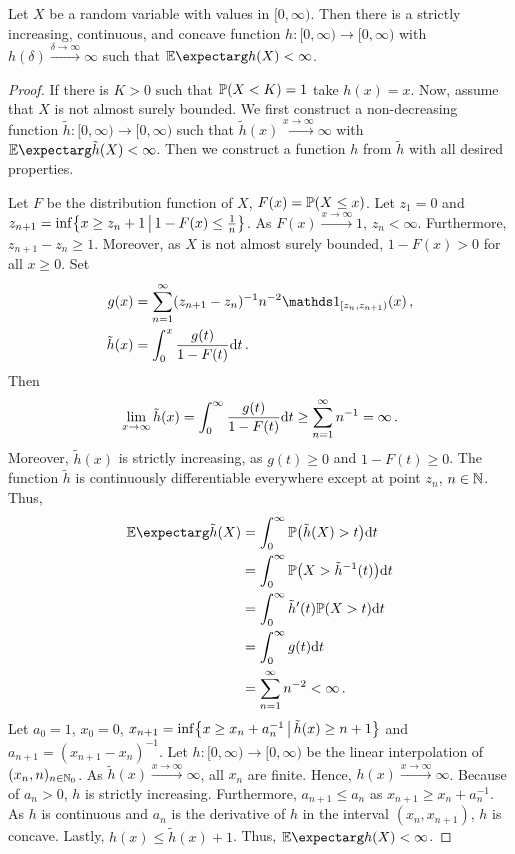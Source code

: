 %
\begin{lemma}\label{lmm:nondec:existence}
	Let $X$ be a random variable with values in $[0,\infty)$. Then there is a strictly increasing, continuous, and concave function $h \colon [0,\infty) \to [0,\infty)$ with $h(\delta)\xrightarrow{\delta\to\infty}\infty$ such that $\Ex{h(X)} < \infty$.
\end{lemma}
%
\begin{proof}
	If there is $K > 0$ such that $\mathbb{P}(X < K) = 1$ take $h(x) = x$. Now, assume that $X$ is not almost surely bounded.
	We first construct a non-decreasing function $\tilde h \colon [0,\infty) \to [0,\infty)$ such that $\tilde h (x) \xrightarrow{x\to\infty}\infty$ with $\Ex{\tilde h(X)} < \infty$.
	Then we construct a function $h$ from $\tilde h$ with all desired properties.
	
	Let $F$ be the distribution function of $X$, $F(x) = \mathbb{P}(X \leq x)$.
	Let $z_1 = 0$ and $z_{n+1} = \inf \mathopen{}\left\lbrace x\geq z_n +1 \,\big\vert\, 1-F(x) \leq \frac1n \right\rbrace\mathclose{}$. As $F(x)\xrightarrow{x\to\infty} 1$, $z_n < \infty$. Furthermore, $z_{n+1}-z_n \geq 1$. Moreover, as $X$ is not almost surely bounded, $1-F(x) > 0$ for all $x\geq 0$. Set 
	\begin{align*}
		g(x) &= \sum_{n=1}^\infty (z_{n+1}-z_n)^{-1}n^{-2}\ind_{[z_n, z_{n+1})} (x)
		\eqcm
		\\
		\tilde h(x) &= \int_0^x \frac{g(t)}{1-F(t)} \dl t
		\eqfs
	\end{align*}
	Then
	\begin{align*}
		\lim_{x\to\infty} \tilde h(x) 
		= 
		\int_0^\infty \frac{g(t)}{1-F(t)} \mathrm{d} t
		\geq
		\sum_{n=1}^\infty n^{-1} 
		= 
		\infty
		\, .
	\end{align*}
	Moreover, $\tilde h(x)$ is strictly increasing, as $g(t)\geq 0$ and $1-F(t) \geq 0$.
	The function $\tilde h$ is continuously differentiable everywhere except at point $z_n$, $n\in\mathbb{N}$. Thus,
	\begin{align*}
		\Ex{\tilde h(X)}
		&=
		\int_0^\infty \PrOf{\tilde h(X) > t} \dl t
		\\&=
		\int_0^\infty \PrOf{X > \tilde h^{-1}(t)} \dl t
		\\&=
		\int_0^\infty \tilde h\pr(t) \PrOf{X > t} \dl t
		\\&=
		\int_0^\infty g(t) \dl t
		\\&=
		\sum_{n=1}^\infty n^{-2}
		<
		\infty
		\eqfs
	\end{align*}
	Let $a_0 = 1$, $x_0=0$, $x_{n+1} = \inf\mathopen{}\left\lbrace x \geq x_n + a_n^{-1} \,\big\vert\, \tilde h(x) \geq n+1 \right\rbrace\mathclose{}$ and $a_{n+1} = (x_{n+1} - x_n)^{-1}$. Let $h \colon [0,\infty) \to [0,\infty)$ be the linear interpolation of $(x_n, n)_{n\in\mathbb{N}_0}$. 
	As $\tilde h(x) \xrightarrow{x\to\infty}\infty$, all $x_n$ are finite. Hence, $h(x) \xrightarrow{x\to\infty}\infty$. 
	Because of $a_n > 0$, $h$ is strictly increasing.
	Furthermore, $a_{n+1} \leq a_n$ as $x_{n+1} \geq x_n + a_n^{-1}$. As $h$ is continuous and $a_n$ is the derivative of $h$ in the interval $(x_n, x_{n+1})$, $h$ is concave. 
	Lastly, $h(x) \leq \tilde h(x) + 1$. Thus, $\Ex{h(X)} < \infty$.
\end{proof}
%